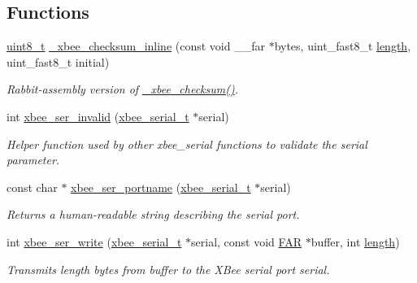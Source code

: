 \subsection*{Functions}
\begin{DoxyCompactItemize}
\item 
\hyperlink{group__hal_gae1affc9ca37cfb624959c866a73f83c2}{uint8\-\_\-t} \hyperlink{group__hal__rabbit_ga02da89986736815045b1a11e1c58733e}{\-\_\-xbee\-\_\-checksum\-\_\-inline} (const void \-\_\-\-\_\-far $\ast$bytes, uint\-\_\-fast8\-\_\-t \hyperlink{group__zdo_gab2b3adeb2a67e656ff030b56727fd0ac}{length}, uint\-\_\-fast8\-\_\-t initial)
\begin{DoxyCompactList}\small\item\em Rabbit-\/assembly version of \hyperlink{group__xbee__device_gac80e0cc51e69ec00731528a04ba8d667}{\-\_\-xbee\-\_\-checksum()}. \end{DoxyCompactList}\item 
int \hyperlink{group__hal__rabbit_ga3c79f6b72b6cfc3cc5c4524450f661b9}{xbee\-\_\-ser\-\_\-invalid} (\hyperlink{structxbee__serial__t}{xbee\-\_\-serial\-\_\-t} $\ast$serial)
\begin{DoxyCompactList}\small\item\em Helper function used by other xbee\-\_\-serial functions to validate the {\itshape serial} parameter. \end{DoxyCompactList}\item 
const char $\ast$ \hyperlink{group__hal__rabbit_ga898057d1b7645785e7f3d6256828d039}{xbee\-\_\-ser\-\_\-portname} (\hyperlink{structxbee__serial__t}{xbee\-\_\-serial\-\_\-t} $\ast$serial)
\begin{DoxyCompactList}\small\item\em Returns a human-\/readable string describing the serial port. \end{DoxyCompactList}\item 
int \hyperlink{group__hal__rabbit_ga2ca4e60c9d642084afa52dff9e1f6be4}{xbee\-\_\-ser\-\_\-write} (\hyperlink{structxbee__serial__t}{xbee\-\_\-serial\-\_\-t} $\ast$serial, const void \hyperlink{group__hal_gaef060b3456fdcc093a7210a762d5f2ed}{F\-A\-R} $\ast$buffer, int \hyperlink{group__zdo_gab2b3adeb2a67e656ff030b56727fd0ac}{length})
\begin{DoxyCompactList}\small\item\em Transmits {\itshape length} bytes from {\itshape buffer} to the X\-Bee serial port {\itshape serial}. \end{DoxyCompactList}\item 

\end{DoxyCompactItemize}
